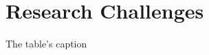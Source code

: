 \section{Research Challenges}\label{sec:intro:challenges}


\lipsum[1-2]


\begin{table}[htbp]
\centering
\caption{The table's caption}
  \label{tab:mytable}
  \begin{adjustbox}{max width=1\textwidth}
      
    \end{adjustbox}
\end{table}

\lipsum[3-4]




\lipsum[1]
